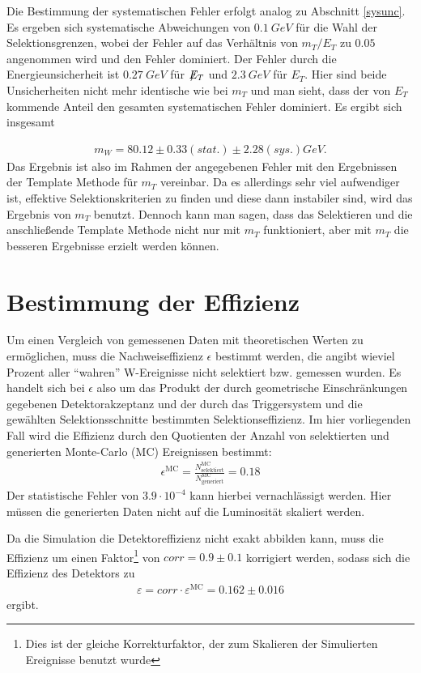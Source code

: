 \documentclass[a4paper,12pt]{article}
\newcommand{\met}{\ensuremath{\not\mathrel{E}}_T}
\begin{document}
Die Bestimmung der systematischen Fehler erfolgt analog zu
Abschnitt \ref{sysunc}. Es ergeben sich systematische Abweichungen von $\SI{0.1}{GeV}$ für die Wahl
der Selektionsgrenzen, wobei der Fehler auf das Verhältnis von $m_T/E_T$ zu $0.05$ angenommen wird
und den Fehler dominiert.
Der Fehler durch die Energieunsicherheit ist $\SI{0.27}{GeV}$ für $\met$ und $\SI{2.3}{GeV}$ für
$E_T$. Hier sind beide Unsicherheiten nicht mehr identische wie bei $m_T$ und man sieht, dass der
von $E_T$ kommende Anteil den gesamten systematischen Fehler dominiert.
Es ergibt sich insgesamt

\begin{align*}
	m_W =  80.12 ± 0.33 (stat.)± 2.28 (sys.) \si{GeV}.
\end{align*}
Das Ergebnis ist also im Rahmen der angegebenen Fehler mit den Ergebnissen der Template Methode für
$m_{T}$ vereinbar.
Da es allerdings sehr viel aufwendiger ist, effektive Selektionskriterien zu finden und diese dann
instabiler sind, wird das Ergebnis von $m_T$ benutzt.
Dennoch kann man sagen, dass das Selektieren und die anschließende Template Methode nicht nur mit
$m_T$ funktioniert, aber mit $m_T$ die besseren Ergebnisse erzielt werden können.
\section{Bestimmung der Effizienz}
\label{effizienz}
Um einen Vergleich von gemessenen Daten mit theoretischen Werten zu ermöglichen, muss die Nachweiseffizienz
$\epsilon$ bestimmt werden, die angibt wieviel Prozent aller "`wahren"' W-Ereignisse nicht selektiert bzw. gemessen wurden.
Es handelt sich bei $\epsilon$ also um das Produkt der durch geometrische Einschränkungen gegebenen Detektorakzeptanz und der
durch das Triggersystem und die gewählten Selektionsschnitte bestimmten Selektionseffizienz. Im hier vorliegenden Fall wird die
Effizienz durch den Quotienten der Anzahl von selektierten und generierten Monte-Carlo (MC) Ereignissen bestimmt:
\begin{align*}
	\epsilon^\text{MC} = \frac{N^\text{MC}_\text{selektiert}}{N^\text{MC}_\text{generiert}} = 0.18
\end{align*}
Der statistische Fehler von $3.9\cdot 10^{-4}$ kann hierbei vernachlässigt werden.
Hier müssen die generierten Daten nicht auf die Luminosität skaliert werden.

Da die Simulation die Detektoreffizienz nicht exakt abbilden kann, muss die Effizienz um einen
Faktor\footnote{Dies ist der gleiche Korrekturfaktor, der zum Skalieren der Simulierten Ereignisse benutzt
wurde}  von $corr = 0.9±0.1$
korrigiert werden, sodass sich die Effizienz des Detektors zu
\begin{align*}
	ε = corr \cdot ε^\text{MC} = 0.162±0.016
\end{align*}
ergibt.
\end{document}
